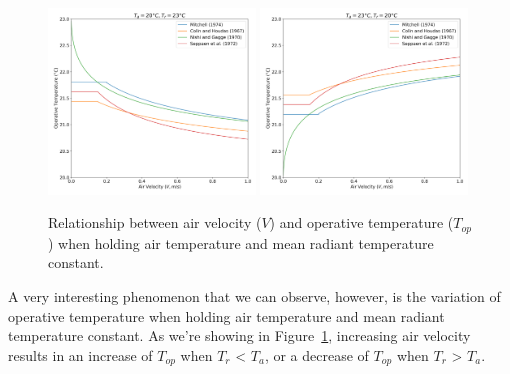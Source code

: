 {\begin{figure}
            \includegraphics[width=0.49\textwidth]{figures/Ta20_Tr23.png}
            \includegraphics[width=0.49\textwidth]{figures/Ta23_Tr20.png}
            \caption{Relationship between air velocity ($V$) and operative temperature ($T_{op}$) when holding air temperature and mean radiant temperature constant.}
            \label{fig:Top_AR}
    \end{figure}
    }

    A very interesting phenomenon that we can observe, however, is the variation of operative temperature when holding air temperature and mean radiant temperature constant. As we're showing in Figure~\ref{fig:Top_AR}, increasing air velocity results in an increase of $T_{op}$ when $T_r$ < $T_a$, or a decrease of $T_{op}$ when $T_r$ > $T_a$.

